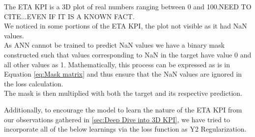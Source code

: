 \documentclass{report} %
\begin{document}

\vspace{0.2cm} %


The ETA \ac{KPI} is a \ac{3D} plot of real numbers ranging between 0 and 100.NEED TO CITE...EVEN IF IT IS A KNOWN FACT. \\
We noticed in some portions of the ETA \ac{KPI}, the plot not visible as it had \ac{NaN} values.\\
As ANN cannot be trained to predict NaN values we have a binary mask constructed such that values corresponding to NaN in the target have value 0 and all other values as 1.
Mathematically, this process can be expressed as is in Equation \ref{eq:Mask matrix} and thus ensure that the NaN values are ignored in the loss calculation. \\ 
The mask is then multiplied with both the target and its respective prediction. 

Additionally, to encourage the model to learn the nature of the ETA \ac{KPI} from our observations gathered in \ref{sec:Deep Dive into 3D KPI}, we have tried to incorporate all of the below learnings via the loss function as Y2 Regularization.\\
\end{document}
